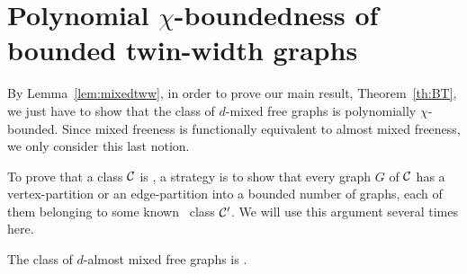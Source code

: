 \section{Polynomial $\chi$-boundedness of bounded twin-width graphs}

By Lemma~\ref{lem:mixedtww}, in order to prove our main result, Theorem~\ref{th:BT}, we just have to show that the class of $d$-mixed free graphs is polynomially $\chi$-bounded. Since mixed freeness is functionally
equivalent to almost mixed freeness, we only consider this last notion.


To prove that a class $\cal C$ is \pcb, a strategy is to show that every graph $G$ of $\cal C$ has a vertex-partition or an edge-partition into a bounded number of graphs, each of them belonging to some known \pcb~class $\cal C '$. We will use this argument several times here.

\begin{theorem}\label{thm:damf-pcb} The class of $d$-almost mixed free graphs is \pcb.
\end{theorem}

